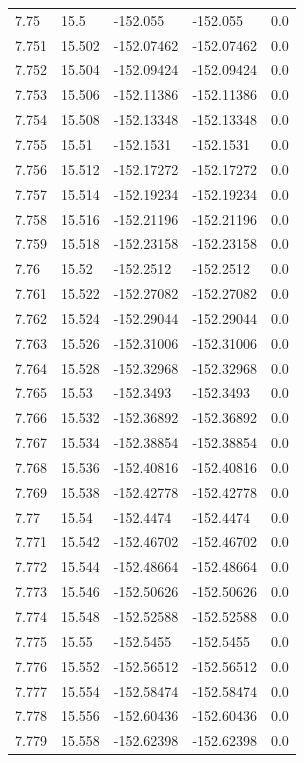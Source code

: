 \begin{tabular}{lllll}
7.75 & 15.5 & -152.055 & -152.055 & 0.0 \\
7.751 & 15.502 & -152.07462 & -152.07462 & 0.0 \\
7.752 & 15.504 & -152.09424 & -152.09424 & 0.0 \\
7.753 & 15.506 & -152.11386 & -152.11386 & 0.0 \\
7.754 & 15.508 & -152.13348 & -152.13348 & 0.0 \\
7.755 & 15.51 & -152.1531 & -152.1531 & 0.0 \\
7.756 & 15.512 & -152.17272 & -152.17272 & 0.0 \\
7.757 & 15.514 & -152.19234 & -152.19234 & 0.0 \\
7.758 & 15.516 & -152.21196 & -152.21196 & 0.0 \\
7.759 & 15.518 & -152.23158 & -152.23158 & 0.0 \\
7.76 & 15.52 & -152.2512 & -152.2512 & 0.0 \\
7.761 & 15.522 & -152.27082 & -152.27082 & 0.0 \\
7.762 & 15.524 & -152.29044 & -152.29044 & 0.0 \\
7.763 & 15.526 & -152.31006 & -152.31006 & 0.0 \\
7.764 & 15.528 & -152.32968 & -152.32968 & 0.0 \\
7.765 & 15.53 & -152.3493 & -152.3493 & 0.0 \\
7.766 & 15.532 & -152.36892 & -152.36892 & 0.0 \\
7.767 & 15.534 & -152.38854 & -152.38854 & 0.0 \\
7.768 & 15.536 & -152.40816 & -152.40816 & 0.0 \\
7.769 & 15.538 & -152.42778 & -152.42778 & 0.0 \\
7.77 & 15.54 & -152.4474 & -152.4474 & 0.0 \\
7.771 & 15.542 & -152.46702 & -152.46702 & 0.0 \\
7.772 & 15.544 & -152.48664 & -152.48664 & 0.0 \\
7.773 & 15.546 & -152.50626 & -152.50626 & 0.0 \\
7.774 & 15.548 & -152.52588 & -152.52588 & 0.0 \\
7.775 & 15.55 & -152.5455 & -152.5455 & 0.0 \\
7.776 & 15.552 & -152.56512 & -152.56512 & 0.0 \\
7.777 & 15.554 & -152.58474 & -152.58474 & 0.0 \\
7.778 & 15.556 & -152.60436 & -152.60436 & 0.0 \\
7.779 & 15.558 & -152.62398 & -152.62398 & 0.0 \\

\end{tabular}
